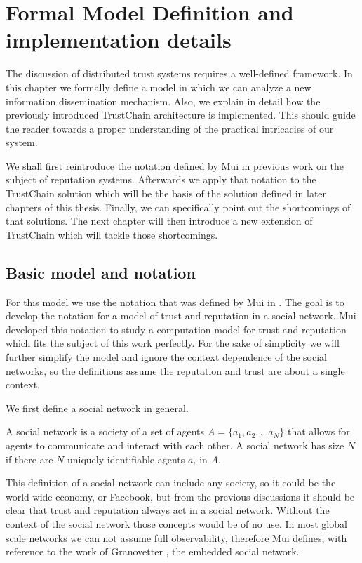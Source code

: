 \chapter{Formal Model Definition and implementation details}
\label{chap:model}
The discussion of distributed trust systems requires a well-defined framework. In this chapter we
formally define a model in which we can analyze a new information dissemination mechanism. Also, we
explain in detail how the previously introduced TrustChain architecture is implemented. This should
guide the reader towards a proper understanding of the practical intricacies of our system. 

We shall first reintroduce the
notation defined by Mui in previous work on the subject of reputation systems. Afterwards we
apply that notation to the TrustChain solution which will be the basis of the solution defined
in later chapters of this thesis. Finally, we can specifically point out the shortcomings of that
solutions. The next chapter will then introduce a new extension of TrustChain which will tackle
those shortcomings.


\section{Basic model and notation}
\label{sec:notation}
For this model we use the notation that was defined by Mui in \cite{mui2002computational}. The goal 
is to develop the notation for a model of trust and reputation in a social network. Mui developed 
this notation to study a computation model for trust and reputation which fits the subject of this 
work perfectly. For the sake of simplicity we will further simplify the model and ignore the context
dependence of the social networks, so the definitions assume the reputation and trust are about a
single context.

We first define a social network in general.

\begin{defn}
    A social network is a society of a set of agents $A = \{a_1, a_2, \dots a_N\}$ that allows for agents to communicate and
    interact with each other. A social network has size $N$ if there are $N$ uniquely identifiable
    agents $a_i$ in $A$.
\end{defn}

This definition of a social network can include any society, so it could be the world wide economy,
or Facebook, but from the previous discussions it should be clear that trust and reputation always 
act in a social network. Without the context of the social network those concepts would be of no
use. In most global scale networks we can not assume full observability, therefore Mui defines, with
reference to the work of Granovetter \cite{granovetter1985economic}, the embedded social network.

